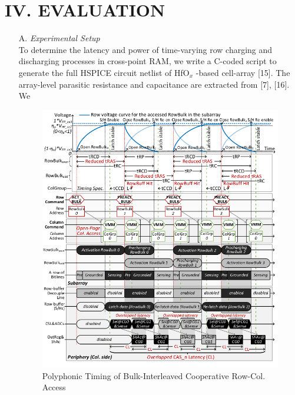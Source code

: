 \documentclass{article}
\begin{document}
 	\section*{IV. EVALUATION}
 		\begin{itemize}
 			\item[A.] \textit{Experimental Setup} \\
 			To determine the latency and power of time-varying row
 			charging and discharging processes in cross-point RAM, we
 			write a C-coded script to generate the full HSPICE circuit
 			netlist of HfO$_x$ -based cell-array [15]. The array-level parasitic
 			resistance and capacitance are extracted from [7], [16]. We
 			
 			\begin{figure}[h]
 				\centering
 				\includegraphics[width=0.7\linewidth]{images/fig8}
 				\caption{Polyphonic Timing of Bulk-Interleaved Cooperative Row-Col. Access}
 				\label{fig:fig8}
 			\end{figure}
 			

\end{itemize}
\end{document}
